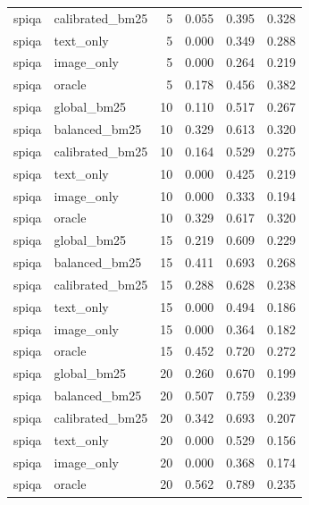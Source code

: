 \begin{tabular}{llrrrr}
spiqa & calibrated\_bm25 & 5 & 0.055 & 0.395 & 0.328 \\
spiqa & text\_only & 5 & 0.000 & 0.349 & 0.288 \\
spiqa & image\_only & 5 & 0.000 & 0.264 & 0.219 \\
spiqa & oracle & 5 & 0.178 & 0.456 & 0.382 \\
spiqa & global\_bm25 & 10 & 0.110 & 0.517 & 0.267 \\
spiqa & balanced\_bm25 & 10 & 0.329 & 0.613 & 0.320 \\
spiqa & calibrated\_bm25 & 10 & 0.164 & 0.529 & 0.275 \\
spiqa & text\_only & 10 & 0.000 & 0.425 & 0.219 \\
spiqa & image\_only & 10 & 0.000 & 0.333 & 0.194 \\
spiqa & oracle & 10 & 0.329 & 0.617 & 0.320 \\
spiqa & global\_bm25 & 15 & 0.219 & 0.609 & 0.229 \\
spiqa & balanced\_bm25 & 15 & 0.411 & 0.693 & 0.268 \\
spiqa & calibrated\_bm25 & 15 & 0.288 & 0.628 & 0.238 \\
spiqa & text\_only & 15 & 0.000 & 0.494 & 0.186 \\
spiqa & image\_only & 15 & 0.000 & 0.364 & 0.182 \\
spiqa & oracle & 15 & 0.452 & 0.720 & 0.272 \\
spiqa & global\_bm25 & 20 & 0.260 & 0.670 & 0.199 \\
spiqa & balanced\_bm25 & 20 & 0.507 & 0.759 & 0.239 \\
spiqa & calibrated\_bm25 & 20 & 0.342 & 0.693 & 0.207 \\
spiqa & text\_only & 20 & 0.000 & 0.529 & 0.156 \\
spiqa & image\_only & 20 & 0.000 & 0.368 & 0.174 \\
spiqa & oracle & 20 & 0.562 & 0.789 & 0.235 \\
\bottomrule
\end{tabular}
